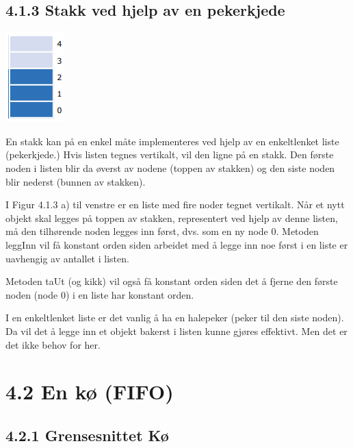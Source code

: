 \documentclass[11pt]{article}
\begin{document}
    \subsection{4.1.3 Stakk ved hjelp av en pekerkjede}
        \begin{multicols}{2}

            \includegraphics[center]{4.1.2-1.png}

            \columnbreak

            En stakk kan på en enkel måte implementeres ved hjelp av en
            enkeltlenket liste (pekerkjede.) Hvis listen tegnes vertikalt, vil den ligne
            på en stakk. Den første noden i listen blir da øverst av nodene (toppen
            av stakken) og den siste noden blir nederst (bunnen av stakken).

            I Figur 4.1.3 a) til venstre er en liste med fire noder tegnet vertikalt.
            Når et nytt objekt skal legges på toppen av stakken, representert ved
            hjelp av denne listen, må den tilhørende noden legges inn først, dvs.
            som en ny node 0. Metoden leggInn vil få konstant orden siden arbeidet
            med å legge inn noe først i en liste er uavhengig av antallet i listen.

            Metoden taUt (og kikk) vil også få konstant orden siden det å fjerne den
            første noden (node 0) i en liste har konstant orden.

            I en enkeltlenket liste er det vanlig å ha en halepeker (peker til den
            siste noden). Da vil det å legge inn et objekt bakerst i listen kunne
            gjøres effektivt. Men det er det ikke behov for her. 
            
        \end{multicols}

\newpage
\section{4.2 En kø (FIFO)}
    \subsection{4.2.1 Grensesnittet Kø}
\end{document}
